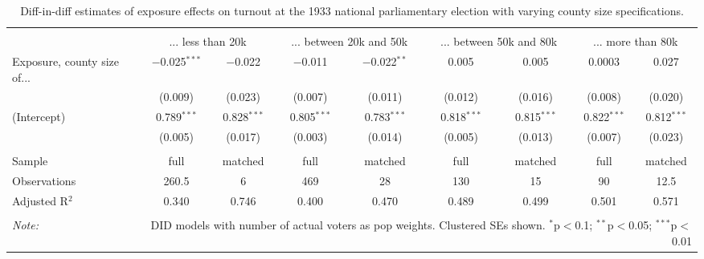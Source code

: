 
\begin{table}[!htbp] \centering 
  \caption{Diff-in-diff estimates of exposure effects on turnout at the 1933 national parliamentary election with varying county size specifications.\vspace{-.25cm}} 
  \label{tab:turnout-countysize-dd-1933} 
\scriptsize 
\begin{tabular}{@{\extracolsep{5pt}}lcccccccc} 
\\[-1.8ex]\hline 
\hline \\[-1.8ex] 
 & \multicolumn{2}{c}{... less than 20k } & \multicolumn{2}{c}{... between 20k and 50k} & \multicolumn{2}{c}{... between 50k and 80k} & \multicolumn{2}{c}{... more than 80k} \\ 
 \cmidrule(r){2-3}\cmidrule(r){4-5}\cmidrule(r){6-7}\cmidrule(r){8-9}Exposure, county size of... & $-$0.025$^{***}$ & $-$0.022 & $-$0.011 & $-$0.022$^{**}$ & 0.005 & 0.005 & 0.0003 & 0.027 \\ 
  & (0.009) & (0.023) & (0.007) & (0.011) & (0.012) & (0.016) & (0.008) & (0.020) \\ 
  (Intercept) & 0.789$^{***}$ & 0.828$^{***}$ & 0.805$^{***}$ & 0.783$^{***}$ & 0.818$^{***}$ & 0.815$^{***}$ & 0.822$^{***}$ & 0.812$^{***}$ \\ 
  & (0.005) & (0.017) & (0.003) & (0.014) & (0.005) & (0.013) & (0.007) & (0.023) \\ 
 \hline \\[-1.8ex] 
Sample & full & matched & full & matched & full & matched & full & matched \\ 
Observations & 260.5 & 6 & 469 & 28 & 130 & 15 & 90 & 12.5 \\ 
Adjusted R$^{2}$ & 0.340 & 0.746 & 0.400 & 0.470 & 0.489 & 0.499 & 0.501 & 0.571 \\ 
\hline 
\hline \\[-1.8ex] 
\textit{Note:}  & \multicolumn{8}{r}{DID models with number of actual voters as pop weights. Clustered SEs shown. $^{*}$p$<$0.1; $^{**}$p$<$0.05; $^{***}$p$<$0.01} \\ 
\end{tabular} 
\end{table} 
